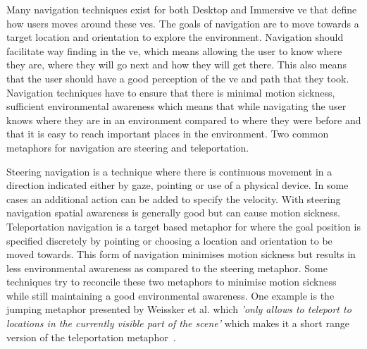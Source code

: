 %
%
%
%
%
%

Many navigation techniques exist for both Desktop and Immersive \acrfull{ve} that define how users moves around these \acrshort{ve}s. The goals of navigation are to move towards a target location and orientation to explore the environment. Navigation should facilitate way finding in the \acrshort{ve}, which means allowing the user to know where they are, where they will go next and how they will get there. This also means that the user should have a good perception of the \acrshort{ve} and path that they took. Navigation techniques have to ensure that there is minimal motion sickness, sufficient environmental awareness which means that while navigating the user knows where they are in an environment compared to where they were before and that it is easy to reach important places in the environment. Two common metaphors for navigation are steering and teleportation.

Steering navigation is a technique where there is continuous movement in a direction indicated either by gaze, pointing or use of a physical device. In some cases an additional action can be added to specify the velocity. With steering navigation spatial awareness is generally good but can cause motion sickness. Teleportation navigation is a target based metaphor for where the goal position is specified discretely by pointing or choosing a location and orientation to be moved towards. This form of navigation minimises motion sickness but results in less environmental awareness as compared to the steering metaphor. Some techniques try to reconcile these two metaphors to minimise motion sickness while still maintaining a good environmental awareness. One example is the jumping metaphor presented by Weissker et al. which \textit{'only allows to teleport to locations in the currently visible part of the scene'} which makes it a short range version of the teleportation metaphor~\cite{Weissker2018}. 

